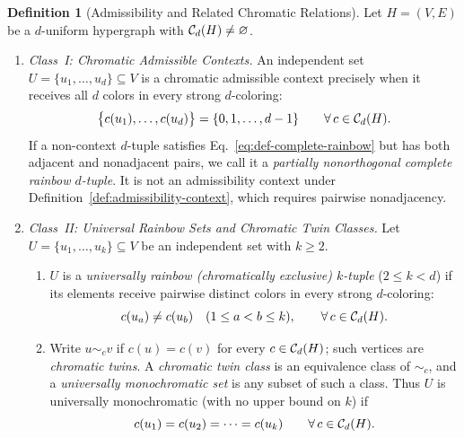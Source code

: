 \documentclass[aps,pra,reprint,superscriptaddress,longbibliography,nofootinbib,floatfix,10pt]{revtex4-2}
\theoremstyle{definition}\newtheorem{definition}[theorem]{Definition}
\theoremstyle{remark}\newtheorem{remark}[theorem]{Remark}
\begin{document}
\begin{definition}[Admissibility and Related Chromatic Relations]\label{def:chromatic-relations}
Let $H=(V,E)$ be a $d$-uniform hypergraph with $\mathcal C_d(H)\neq\varnothing$.
\begin{enumerate}
\item \emph{Class~I: Chromatic Admissible Contexts.} An independent set $U=\{u_1,\ldots,u_d\}\subseteq V$ is a chromatic admissible context precisely when it receives all $d$ colors in every strong $d$-coloring:
\begin{equation}\label{eq:def-complete-rainbow}
\bigl\{c(u_1),\ldots,c(u_d)\bigr\} = \{0,1,\ldots,d-1\} \qquad \forall\, c\in\mathcal C_d(H).
\end{equation}
If a non-context $d$-tuple satisfies Eq.~\eqref{eq:def-complete-rainbow} but has both adjacent and nonadjacent pairs, we call it a \emph{partially nonorthogonal complete rainbow $d$-tuple}. It is not an admissibility context under Definition~\ref{def:admissibility-context}, which requires pairwise nonadjacency.

\item \emph{Class~II: Universal Rainbow Sets and Chromatic Twin Classes.} Let $U=\{u_1,\ldots,u_k\}\subseteq V$ be an independent set with $k\ge2$.
\begin{enumerate}
\item $U$ is a \emph{universally rainbow (chromatically exclusive) $k$-tuple} ($2\le k<d$) if its elements receive pairwise distinct colors in every strong $d$-coloring:
\begin{equation}\label{eq:def-subcomplete}
c(u_a)\neq c(u_b) \quad (1\le a<b\le k),\qquad \forall\, c\in\mathcal C_d(H).
\end{equation}
\item Write $u\sim_c v$ if $c(u)=c(v)$ for every $c\in\mathcal C_d(H)$; such vertices are \emph{chromatic twins}. A \emph{chromatic twin class} is an equivalence class of $\sim_c$, and a \emph{universally monochromatic set} is any subset of such a class. Thus $U$ is universally monochromatic (with no upper bound on $k$) if
\begin{equation}\label{eq:def-monochromatic}
c(u_1)=c(u_2)=\cdots=c(u_k) \qquad \forall\, c\in\mathcal C_d(H).
\end{equation}
\end{enumerate}


\end{enumerate}
\end{definition}
\end{document}
